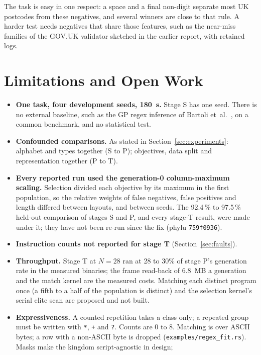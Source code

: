 \documentclass[sigconf,nonacm]{acmart}
\newcommand{\rx}{\lstinline[style=mono]}
\newcommand{\src}[1]{{\small\nolinkurl{#1}}}
\begin{document}
The task is easy in one respect: a space and a final non-digit separate most UK
postcodes from these negatives, and several winners are close to that rule. A
harder test needs negatives that share those features, such as the near-miss
families of the GOV.UK validator sketched in the earlier report, with retained
logs.

\section{Limitations and Open Work}
\label{sec:limits}

\begin{itemize}
\item \textbf{One task, four development seeds, 180~s.} Stage S has one seed.
There is no external baseline, such as the GP regex inference of Bartoli
et~al.~\cite{bartoli2016regex}, on a common benchmark, and no statistical test.
\item \textbf{Confounded comparisons.} As stated in
Section~\ref{sec:experiments}: alphabet and types together (S to P); objectives,
data split and representation together (P to T).
\item \textbf{Every reported run used the generation-0 column-maximum
scaling.} Selection divided each objective by its maximum in the first
population, so the relative weights of false negatives, false positives and
length differed between layouts, and between seeds. The 92.4\,\% to 97.5\,\%
held-out comparison of stages S and P, and every stage-T result, were made
under it; they have not been re-run since the fix (phylu \texttt{759f0936}).
\item \textbf{Instruction counts not reported for stage T} (Section~\ref{sec:faults}).
\item \textbf{Throughput.} Stage T at $N=28$ ran at 28 to 30\% of stage P's
generation rate in the measured binaries; the frame read-back of 6.8~MB a
generation and the match kernel are the measured costs. Matching each distinct
program once (a fifth to a half of the population is distinct) and the selection
kernel's serial elite scan are proposed and not built.
\item \textbf{Expressiveness.} A counted repetition takes a class only; a
repeated group must be written with \rx!*!, \rx!+! and \rx!?!. Counts are 0 to 8.
Matching is over ASCII bytes; a row with a non-ASCII byte is dropped
(\src{examples/regex_fit.rs}). Masks make the kingdom script-agnostic in design;

\end{itemize}
\end{document}
